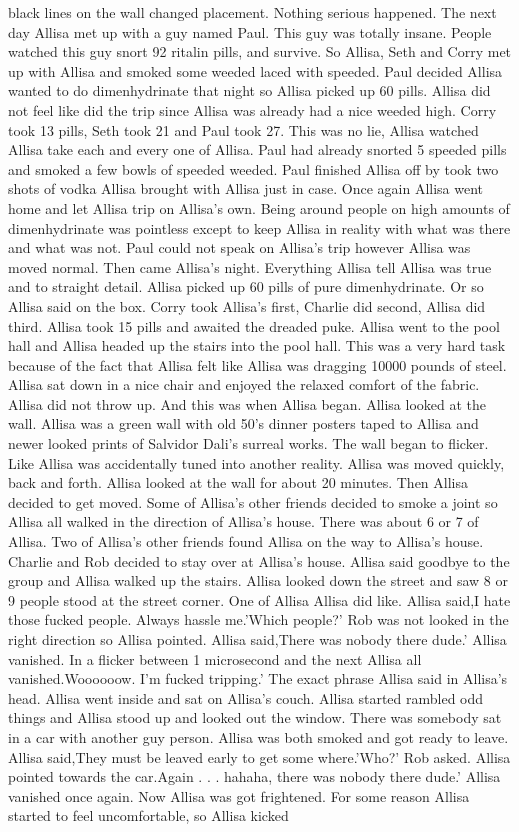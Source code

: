 \documentclass[12pt]{book}
\begin{document}
black lines on the wall changed placement. Nothing serious happened. The next day Allisa met up with a guy named Paul. This guy was totally insane. People watched this guy snort 92 ritalin pills, and survive. So Allisa, Seth and Corry met up with Allisa and smoked some weeded laced with speeded. Paul decided Allisa wanted to do dimenhydrinate that night so Allisa picked up 60 pills. Allisa did not feel like did the trip since Allisa was already had a nice weeded high. Corry took 13 pills, Seth took 21 and Paul took 27. This was no lie, Allisa watched Allisa take each and every one of Allisa. Paul had already snorted 5 speeded pills and smoked a few bowls of speeded weeded. Paul finished Allisa off by took two shots of vodka Allisa brought with Allisa just in case. Once again Allisa went home and let Allisa trip on Allisa's own. Being around people on high amounts of dimenhydrinate was pointless except to keep Allisa in reality with what was there and what was not. Paul could not speak on Allisa's trip however Allisa was moved normal. Then came Allisa's night. Everything Allisa tell Allisa was true and to straight detail. Allisa picked up 60 pills of pure dimenhydrinate. Or so Allisa said on the box. Corry took Allisa's first, Charlie did second, Allisa did third. Allisa took 15 pills and awaited the dreaded puke. Allisa went to the pool hall and Allisa headed up the stairs into the pool hall. This was a very hard task because of the fact that Allisa felt like Allisa was dragging 10000 pounds of steel. Allisa sat down in a nice chair and enjoyed the relaxed comfort of the fabric. Allisa did not throw up. And this was when Allisa began. Allisa looked at the wall. Allisa was a green wall with old 50's dinner posters taped to Allisa and newer looked prints of Salvidor Dali's surreal works. The wall began to flicker. Like Allisa was accidentally tuned into another reality. Allisa was moved quickly, back and forth. Allisa looked at the wall for about 20 minutes. Then Allisa decided to get moved. Some of Allisa's other friends decided to smoke a joint so Allisa all walked in the direction of Allisa's house. There was about 6 or 7 of Allisa. Two of Allisa's other friends found Allisa on the way to Allisa's house. Charlie and Rob decided to stay over at Allisa's house. Allisa said goodbye to the group and Allisa walked up the stairs. Allisa looked down the street and saw 8 or 9 people stood at the street corner. One of Allisa Allisa did like. Allisa said,I hate those fucked people. Always hassle me.'Which people?' Rob was not looked in the right direction so Allisa pointed. Allisa said,There was nobody there dude.' Allisa vanished. In a flicker between 1 microsecond and the next Allisa all vanished.Woooooow. I'm fucked tripping.' The exact phrase Allisa said in Allisa's head. Allisa went inside and sat on Allisa's couch. Allisa started rambled odd things and Allisa stood up and looked out the window. There was somebody sat in a car with another guy person. Allisa was both smoked and got ready to leave. Allisa said,They must be leaved early to get some where.'Who?' Rob asked. Allisa pointed towards the car.Again . . .  hahaha, there was nobody there dude.' Allisa vanished once again. Now Allisa was got frightened. For some reason Allisa started to feel uncomfortable, so Allisa kicked 
\end{document}
